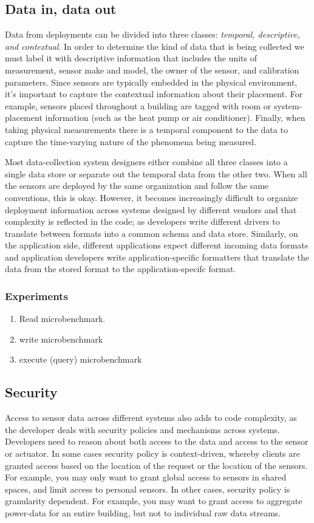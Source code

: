 \subsection{Data in, data out}
Data from deployments can be divided into three classes: \emph{temporal, descriptive, and contextual}.  In order to
determine the kind of data that is being collected we must label it with descriptive information that includes the units of
measurement, sensor make and model, the owner of the sensor, and calibration parameters.  Since sensors
are typically embedded in the physical environment, it's important to capture the contextual information about their placement.
For example, sensors placed throughout a building are tagged with room or system-placement information (such as the heat pump or 
air conditioner).  Finally, when taking physical measurements 
there is a temporal component to the data to capture the time-varying nature of the phenomena being measured.  

Most data-collection system designers either combine all three classes into a single data store or separate out the temporal
data from the other two.  When all the sensors are deployed by the same organization and follow the same conventions, this is okay.  
However, it becomes increasingly difficult to organize deployment information across systems designed by different vendors and that 
complexity is reflected in the code; as developers write different drivers to translate between formats into a common schema and data 
store.  Similarly, on the application side, different applications expect different incoming data formats and application developers
write application-specific formatters that translate the data from the stored format to the application-specifc format.

\subsubsection{Experiments}
\begin{enumerate}
\item Read microbenchmark.
\item write microbenchmark 
\item execute (query) microbenchmark 
\end{enumerate}

\subsection{Security}
Access to sensor data across different systems also adds to code complexity, as the developer deals with security policies and
mechanisms across systems.  Developers need to reason about both access to the data and access to the sensor or actuator.
In some cases security policy is context-driven, whereby clients are granted access based on the location of the request or
the location of the sensors.  For example, you may only want to grant global access to sensors in shared spaces, and limit
access to personal sensors.  In other cases, security policy is granularity dependent.  For example, you may want to grant access
to aggregate power-data for an entire building, but not to individual raw data streams.

